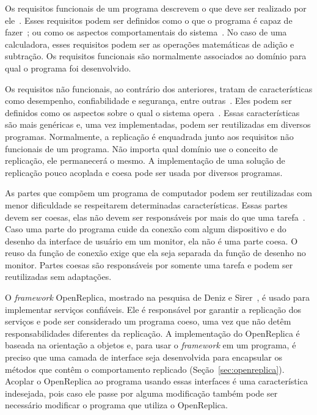 Os requisitos funcionais de um programa descrevem o que deve ser realizado por ele~\cite{glinz2007non}. Esses requisitos podem ser definidos como o que o programa é capaz de fazer~\cite{glossary1990ieee}; ou como os aspectos comportamentais do sistema~\cite{anton1997goal}. No caso de uma calculadora, esses requisitos podem ser as operações matemáticas de adição e subtração. Os requisitos funcionais são normalmente associados ao domínio para qual o programa foi desenvolvido.

Os requisitos não funcionais, ao contrário dos anteriores, tratam de características como desempenho, confiabilidade e segurança, entre outras~\cite{glinz2007non}. Eles podem ser definidos como os aspectos sobre o qual o sistema opera~\cite{anton1997goal}. Essas características são mais genéricas e, uma vez implementadas, podem ser reutilizadas em diversos programas. Normalmente, a replicação é enquadrada junto aos requisitos não funcionais de um programa. Não importa qual domínio use o conceito de replicação, ele permanecerá o mesmo. A implementação de uma solução de replicação pouco acoplada e coesa pode ser usada por diversos programas.

As partes que compõem um programa de computador podem ser reutilizadas com menor dificuldade se respeitarem determinadas características. Essas partes devem ser coesas, elas não devem ser responsáveis por mais do que uma tarefa~\cite{eder1994coupling}. Caso uma parte do programa cuide da conexão com algum dispositivo e do desenho da interface de usuário em um monitor, ela não é uma parte coesa. O reuso da função de conexão exige que ela seja separada da função de desenho no monitor. Partes coesas são responsáveis por somente uma tarefa e podem ser reutilizadas sem adaptações.

O \textit{framework} OpenReplica, mostrado na pesquisa de Deniz e Sirer~\cite{altinbuken2012commodifying}, é usado para implementar serviços confiáveis. Ele é responsável por garantir a replicação dos serviços e pode ser considerado um programa coeso, uma vez que não detêm responsabilidades diferentes da replicação. A implementação do OpenReplica é baseada na orientação a objetos e, para usar o \textit{framework} em um programa, é preciso que uma camada de interface seja desenvolvida para encapsular os métodos que contêm o comportamento replicado (Seção~\ref{sec:openreplica}). Acoplar o OpenReplica ao programa usando essas interfaces é uma característica indesejada, pois caso ele passe por alguma modificação também pode ser necessário modificar o programa que utiliza o OpenReplica.


